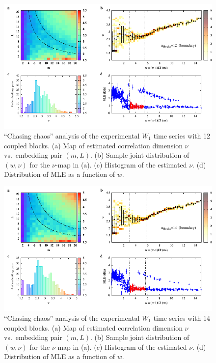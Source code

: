 \begin{appendices}
\begin{figure}[!htbp]
    \centering
    \includegraphics[width=\linewidth]{../blocks/12_blocks/2e5_points/plots/chaos_low.pdf}
    \caption{``Chasing chaos'' analysis of the experimental $W_1$ time series with 12 coupled blocks.
    (a) Map of estimated correlation dimension $\nu$ vs.\ embedding pair $(m, L)$.
    (b) Sample joint distribution of $(w,\nu)$ for the $\nu$-map in (a).
    (c) Histogram of the estimated $\nu$. (d) Distribution of MLE as a function of $w$.
    } 
\end{figure}

\begin{figure}[!htbp]
    \centering
    \includegraphics[width=\linewidth]{../blocks/14_blocks/2e5_points/plots/chaos_low.pdf}
    \caption{``Chasing chaos'' analysis of the experimental $W_1$ time series with 14 coupled blocks.
    (a) Map of estimated correlation dimension $\nu$ vs.\ embedding pair $(m, L)$.
    (b) Sample joint distribution of $(w,\nu)$ for the $\nu$-map in (a).
    (c) Histogram of the estimated $\nu$. (d) Distribution of MLE as a function of $w$.
    } 
\end{figure}


\end{appendices}
